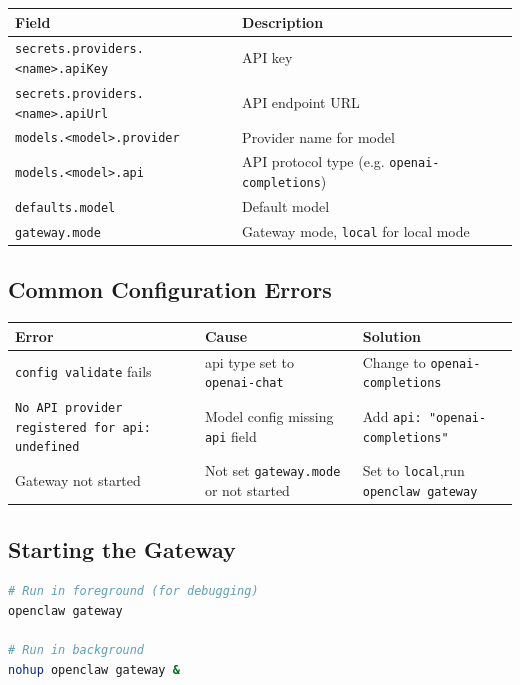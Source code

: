 \begin{table}[h]
\centering
\small
\begin{tabular}{|l|l|}
\hline
Field & Description \\
\hline
\texttt{secrets.providers.<name>.apiKey} & API key \\
\hline
\texttt{secrets.providers.<name>.apiUrl} & API endpoint URL \\
\hline
\texttt{models.<model>.provider} & Provider name for model \\
\hline
\texttt{models.<model>.api} & API protocol type (e.g. \texttt{openai-completions}) \\
\hline
\texttt{defaults.model} & Default model \\
\hline
\texttt{gateway.mode} & Gateway mode, \texttt{local} for local mode \\
\hline
\end{tabular}
\end{table}

\subsection{Common Configuration Errors}


\begin{table}[h]
\centering
\small
\begin{tabular}{|l|l|l|}
\hline
Error & Cause & Solution \\
\hline
\texttt{config validate} fails & api type set to \texttt{openai-chat} & Change to \texttt{openai-completions} \\
\hline
\texttt{No API provider registered for api: undefined} & Model config missing \texttt{api} field & Add  \texttt{api: "openai-completions"} \\
\hline
Gateway not started & Not set \texttt{gateway.mode} or not started & Set to \texttt{local},run \texttt{openclaw gateway} \\
\hline
\end{tabular}
\end{table}

\subsection{Starting the Gateway}


\begin{lstlisting}[language=bash]
# Run in foreground (for debugging)
openclaw gateway

# Run in background
nohup openclaw gateway &
\end{lstlisting}

